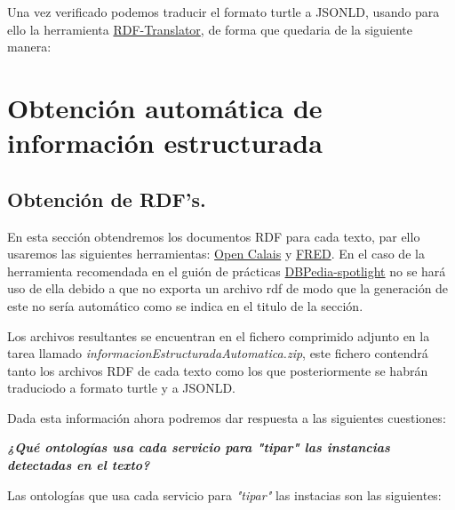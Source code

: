 \documentclass[spanish]{llncs}   %
\begin{document}
Una vez verificado podemos traducir el formato turtle a JSONLD, usando para ello la herramienta \href{https://rdf-translator.appspot.com}{RDF-Translator}, de forma que quedaria de la siguiente manera:




\section{Obtención automática de información estructurada}

\subsection{Obtención de RDF's.}

En esta sección obtendremos los documentos RDF para cada texto, par ello usaremos las siguientes herramientas: 
\href{https://www.refinitiv.com/en/products/intelligent-tagging-text-analytics}{Open Calais} y 
\href{http://wit.istc.cnr.it/stlab-tools/fred/demo/?}{FRED}. En el caso de la herramienta recomendada en el guión de prácticas
\href{https://www.dbpedia-spotlight.org/demo/}{DBPedia-spotlight} no se hará uso de ella debido a que no exporta un archivo rdf de modo 
que la generación de este no sería automático como se indica en el titulo de la sección.

Los archivos resultantes se encuentran en el fichero comprimido adjunto en la tarea llamado \textit{informacionEstructuradaAutomatica.zip}, 
este fichero contendrá tanto los archivos RDF de cada texto como los  que posteriormente se habrán traduciodo a formato turtle y a JSONLD.

Dada esta información ahora podremos dar respuesta a las siguientes cuestiones:

\textbf{\textit{¿Qué ontologías usa cada servicio para "tipar" las instancias detectadas en el texto?}}

Las ontologías que usa cada servicio para \textit{"tipar"} las instacias son las siguientes:
\end{document}
